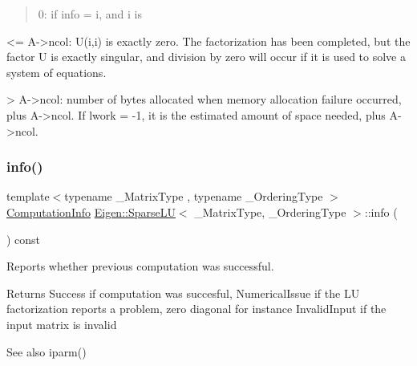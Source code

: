 \begin{quote}
0\+: if info = i, and i is \end{quote}
\begin{DoxyVerb}  <= A->ncol: U(i,i) is exactly zero. The factorization has
     been completed, but the factor U is exactly singular,
     and division by zero will occur if it is used to solve a
     system of equations.

  > A->ncol: number of bytes allocated when memory allocation
    failure occurred, plus A->ncol. If lwork = -1, it is
    the estimated amount of space needed, plus A->ncol.  
\end{DoxyVerb}
 \mbox{\label{class_eigen_1_1_sparse_l_u_ab0d0c1744ffd5a1dff578a44bcef2a3d}} 
\subsubsection{\texorpdfstring{info()}{info()}}
{\footnotesize\ttfamily template$<$typename \+\_\+\+Matrix\+Type , typename \+\_\+\+Ordering\+Type $>$ \\
\mbox{\hyperlink{group__enums_ga85fad7b87587764e5cf6b513a9e0ee5e}{Computation\+Info}} \mbox{\hyperlink{class_eigen_1_1_sparse_l_u}{Eigen\+::\+Sparse\+LU}}$<$ \+\_\+\+Matrix\+Type, \+\_\+\+Ordering\+Type $>$\+::info (\begin{DoxyParamCaption}{ }\end{DoxyParamCaption}) const\hspace{0.3cm}{\ttfamily [inline]}}



Reports whether previous computation was successful. 

\begin{DoxyReturn}{Returns}
{\ttfamily Success} if computation was succesful, {\ttfamily Numerical\+Issue} if the LU factorization reports a problem, zero diagonal for instance {\ttfamily Invalid\+Input} if the input matrix is invalid
\end{DoxyReturn}
\begin{DoxySeeAlso}{See also}
iparm() 
\end{DoxySeeAlso}
\mbox{\label{class_eigen_1_1_sparse_l_u_afff3bd506cd78172e5219c707562729f}} 
